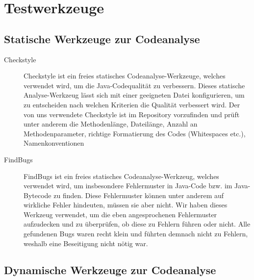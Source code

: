 \section{Testwerkzeuge}
\subsection{Statische Werkzeuge zur Codeanalyse}
\begin{description}
\item[Checkstyle ]Checkstyle ist ein freies statisches Codeanalyse-Werkzeuge, welches verwendet wird, um die Java-Codequalität zu verbessern.
	Dieses statische Analyse-Werkzeug lässt sich mit einer geeigneten Datei konfigurieren, um zu entscheiden nach welchen Kriterien
	die Qualität verbessert wird. Der von uns verwendete Checkstyle ist im Repository vorzufinden und prüft unter anderem die Methodenlänge, 
	Dateilänge, Anzahl an Methodenparameter, richtige Formatierung des Codes (Whitespaces etc.), Namenkonventionen 



\item[FindBugs] FindBugs ist ein freies statisches Codeanalyse-Werkzeug, welches verwendet wird, um insbesondere Fehlermuster in Java-Code bzw. im Java-Bytecode zu finden.
	Diese Fehlermuster können unter anderem auf wirkliche Fehler hindeuten, müssen sie aber nicht.
	Wir haben dieses Werkzeug verwendet, um die eben angesprochenen Fehlermuster aufzudecken und zu überprüfen, ob diese zu Fehlern
	führen oder nicht. Alle gefundenen Bugs waren recht klein und führten demnach nicht zu Fehlern, weshalb eine Beseitigung nicht nötig war.
\end{description}

\subsection{Dynamische Werkzeuge zur Codeanalyse}


